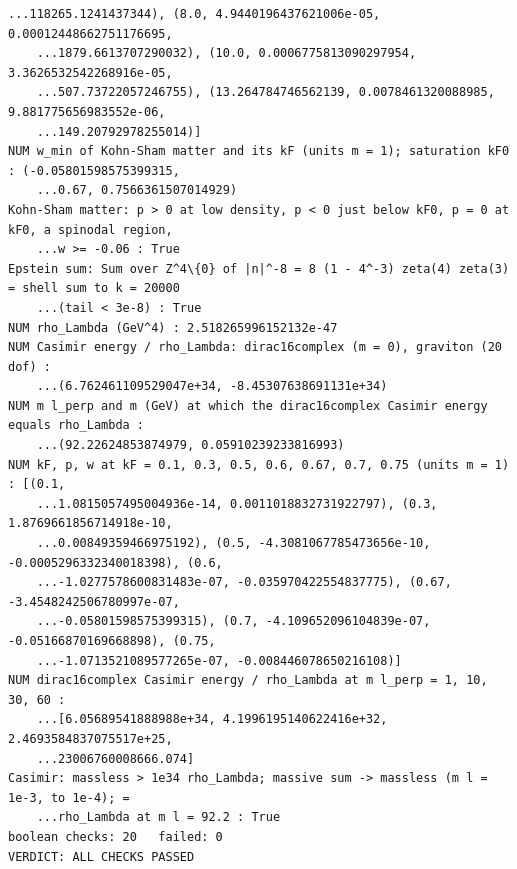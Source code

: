 \documentclass[10pt,a4paper]{article}
\begin{document}
\begin{Verbatim}[fontsize=\small,frame=single,framesep=2mm]
    ...118265.1241437344), (8.0, 4.9440196437621006e-05, 0.00012448662751176695,
    ...1879.6613707290032), (10.0, 0.0006775813090297954, 3.3626532542268916e-05,
    ...507.73722057246755), (13.264784746562139, 0.0078461320088985, 9.881775656983552e-06,
    ...149.20792978255014)]
NUM w_min of Kohn-Sham matter and its kF (units m = 1); saturation kF0 : (-0.05801598575399315,
    ...0.67, 0.7566361507014929)
Kohn-Sham matter: p > 0 at low density, p < 0 just below kF0, p = 0 at kF0, a spinodal region,
    ...w >= -0.06 : True
Epstein sum: Sum over Z^4\{0} of |n|^-8 = 8 (1 - 4^-3) zeta(4) zeta(3) = shell sum to k = 20000
    ...(tail < 3e-8) : True
NUM rho_Lambda (GeV^4) : 2.518265996152132e-47
NUM Casimir energy / rho_Lambda: dirac16complex (m = 0), graviton (20 dof) :
    ...(6.762461109529047e+34, -8.45307638691131e+34)
NUM m l_perp and m (GeV) at which the dirac16complex Casimir energy equals rho_Lambda :
    ...(92.22624853874979, 0.05910239233816993)
NUM kF, p, w at kF = 0.1, 0.3, 0.5, 0.6, 0.67, 0.7, 0.75 (units m = 1) : [(0.1,
    ...1.0815057495004936e-14, 0.0011018832731922797), (0.3, 1.8769661856714918e-10,
    ...0.00849359466975192), (0.5, -4.3081067785473656e-10, -0.0005296332340018398), (0.6,
    ...-1.0277578600831483e-07, -0.035970422554837775), (0.67, -3.4548242506780997e-07,
    ...-0.05801598575399315), (0.7, -4.109652096104839e-07, -0.05166870169668898), (0.75,
    ...-1.0713521089577265e-07, -0.008446078650216108)]
NUM dirac16complex Casimir energy / rho_Lambda at m l_perp = 1, 10, 30, 60 :
    ...[6.05689541888988e+34, 4.1996195140622416e+32, 2.4693584837075517e+25,
    ...23006760008666.074]
Casimir: massless > 1e34 rho_Lambda; massive sum -> massless (m l = 1e-3, to 1e-4); =
    ...rho_Lambda at m l = 92.2 : True
boolean checks: 20   failed: 0
VERDICT: ALL CHECKS PASSED
\end{Verbatim}
\end{document}
